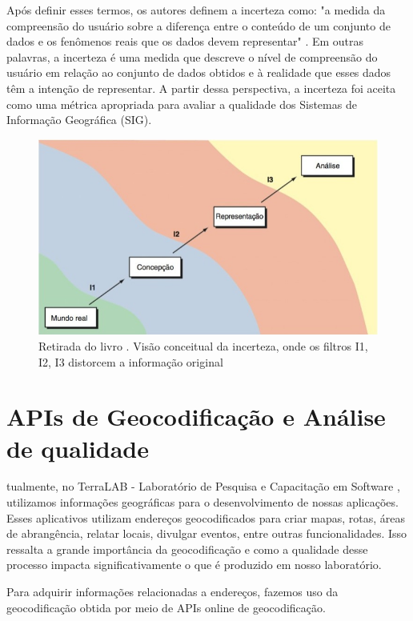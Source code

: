 Após definir esses termos, os autores definem a incerteza como: "a medida da compreensão do usuário sobre a diferença entre o conteúdo de um conjunto de dados e os fenômenos reais que os dados devem representar" \cite{longley2013}. Em outras palavras, a incerteza é uma medida que descreve o nível de compreensão do usuário em relação ao conjunto de dados obtidos e à realidade que esses dados têm a intenção de representar. A partir dessa perspectiva, a incerteza foi aceita como uma métrica apropriada para avaliar a qualidade dos Sistemas de Informação Geográfica (SIG).

\begin{figure}[ht]
   \centering
   \includegraphics[width=\textwidth]{Figuras/incertezaLivro.jpeg}
   \caption{Retirada do livro \cite{longley2013}. Visão conceitual da incerteza, onde os filtros I1, I2, I3 distorcem a informação original}
   \label{fig:incerteza}
\end{figure}

\section{APIs de Geocodificação e Análise de qualidade}
tualmente, no TerraLAB - Laboratório de Pesquisa e Capacitação em Software \cite{terralab}, utilizamos informações geográficas para o desenvolvimento de nossas aplicações. Esses aplicativos utilizam endereços geocodificados para criar mapas, rotas, áreas de abrangência, relatar locais, divulgar eventos, entre outras funcionalidades. Isso ressalta a grande importância da geocodificação e como a qualidade desse processo impacta significativamente o que é produzido em nosso laboratório.

Para adquirir informações relacionadas a endereços, fazemos uso da geocodificação obtida por meio de APIs online de geocodificação.

